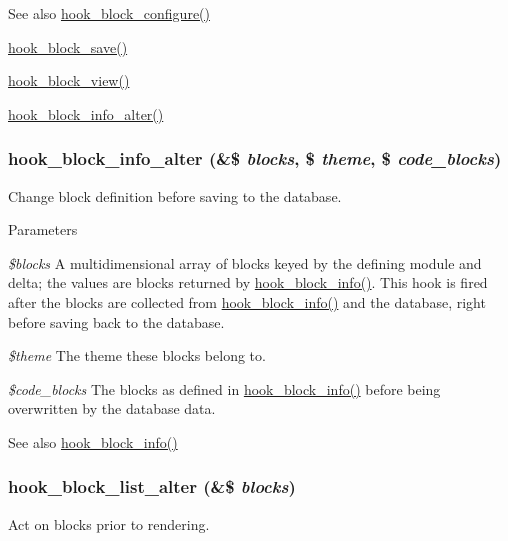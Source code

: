 \begin{DoxySeeAlso}{See also}
\hyperlink{group__hooks_gacc86fefd1e0299f387f79a37dd1a48b7}{hook\_\-block\_\-configure()} 

\hyperlink{group__hooks_ga622024ce4f818c241ca7a765e829f928}{hook\_\-block\_\-save()} 

\hyperlink{group__hooks_gaa14092a3e74cdc57aa295100cfd6860d}{hook\_\-block\_\-view()} 

\hyperlink{group__hooks_ga6a57bda0a2640ccadef4d7c8b6d2a26f}{hook\_\-block\_\-info\_\-alter()} 
\end{DoxySeeAlso}
\hypertarget{group__hooks_ga6a57bda0a2640ccadef4d7c8b6d2a26f}{
\subsubsection[{hook\_\-block\_\-info\_\-alter}]{\setlength{\rightskip}{0pt plus 5cm}hook\_\-block\_\-info\_\-alter (\&\$ {\em blocks}, \/  \$ {\em theme}, \/  \$ {\em code\_\-blocks})}}
\label{group__hooks_ga6a57bda0a2640ccadef4d7c8b6d2a26f}
Change block definition before saving to the database.


\begin{DoxyParams}{Parameters}
\item[{\em \$blocks}]A multidimensional array of blocks keyed by the defining module and delta; the values are blocks returned by \hyperlink{group__hooks_ga2bd926c3e90deeba0c3ba64fb3c64d73}{hook\_\-block\_\-info()}. This hook is fired after the blocks are collected from \hyperlink{group__hooks_ga2bd926c3e90deeba0c3ba64fb3c64d73}{hook\_\-block\_\-info()} and the database, right before saving back to the database. \item[{\em \$theme}]The theme these blocks belong to. \item[{\em \$code\_\-blocks}]The blocks as defined in \hyperlink{group__hooks_ga2bd926c3e90deeba0c3ba64fb3c64d73}{hook\_\-block\_\-info()} before being overwritten by the database data.\end{DoxyParams}
\begin{DoxySeeAlso}{See also}
\hyperlink{group__hooks_ga2bd926c3e90deeba0c3ba64fb3c64d73}{hook\_\-block\_\-info()} 
\end{DoxySeeAlso}
\hypertarget{group__hooks_gaf38c7633b52b18831e3ec0459d8e9f41}{
\subsubsection[{hook\_\-block\_\-list\_\-alter}]{\setlength{\rightskip}{0pt plus 5cm}hook\_\-block\_\-list\_\-alter (\&\$ {\em blocks})}}
\label{group__hooks_gaf38c7633b52b18831e3ec0459d8e9f41}
Act on blocks prior to rendering.

